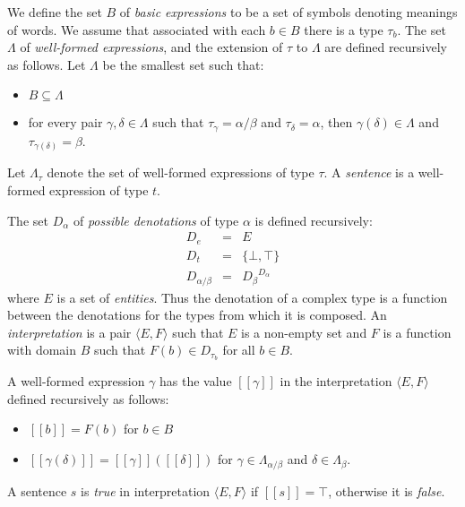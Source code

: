 \documentclass[11pt]{article}
\theoremstyle{definition}
\newcommand{\interp}[1]{[\![ #1 ]\!]}
\begin{document}
We define the set $B$ of \emph{basic expressions} to be a set of
symbols denoting meanings of words. We assume that associated with
each $b\in B$ there is a type $\tau_b$. The set $\Lambda$ of
\emph{well-formed expressions}, and the extension of $\tau$ to $\Lambda$ are
defined recursively as follows. Let $\Lambda$ be the smallest set such that:

\begin{itemize}
\item $B\subseteq \Lambda$
\item for every pair $\gamma,\delta\in \Lambda$ such that $\tau_\gamma
  = \alpha/\beta$ and $\tau_\delta = \alpha$, then $\gamma(\delta)\in
  \Lambda$ and $\tau_{\gamma(\delta)} = \beta$.
\end{itemize}

Let $\Lambda_\tau$ denote the set of well-formed expressions of type
$\tau$. A \emph{sentence} is a well-formed expression of type $t$.


The set $D_\alpha$ of \emph{possible denotations} of type $\alpha$ is
defined recursively:
\begin{eqnarray*}
D_e &=& E\\
D_t &=& \{\bot,\top\}\\
D_{\alpha/\beta} &=& {D_\beta}^{D_\alpha}
\end{eqnarray*}
where $E$ is a set of \emph{entities}. Thus the denotation of a
complex type is a function between the denotations for the types from
which it is composed. An \emph{interpretation} is a pair $\langle E,
F\rangle$ such that $E$ is a non-empty set and $F$ is a function with
domain $B$ such that $F(b) \in D_{\tau_b}$ for all $b\in B$.

A well-formed expression $\gamma$ has the value $\interp{\gamma}$ in the
interpretation $\langle E, F\rangle$ defined recursively as follows:
\begin{itemize}
\item $\interp{b} = F(b)$ for $b\in B$
\item $\interp{\gamma(\delta)} = \interp{\gamma}(\interp{\delta})$ for $\gamma
  \in \Lambda_{\alpha/\beta}$ and $\delta \in \Lambda_\beta$.
\end{itemize}
A sentence $s$ is \emph{true} in interpretation $\langle E, F\rangle$
if $\interp{s} = \top$, otherwise it is \emph{false}.
\end{document}

